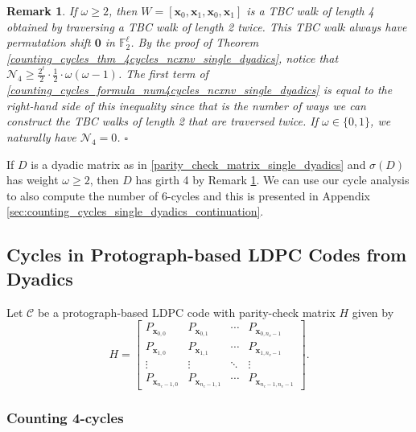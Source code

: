 \documentclass[11pt]{article}
\theoremstyle{plain}
\theoremstyle{plain}
\newtheorem{PreRemark}[lemma]{{\textbf{Remark}}}
\newenvironment{remark}%
    {\begin{PreRemark}\upshape}{\hfill$\square$\end{PreRemark}}
\theoremstyle{definition}
\numberwithin{theo}{section}
\newcommand{\bzero}{\mathbf{0}}
\newcommand{\bx}{{\mathbf x}}
\def\matrix#1{\begin{bmatrix}#1\end{bmatrix}} %
\newcounter{rom}
\begin{document}
\begin{remark}
\label{remark_N4_lower_bound}
If $\omega\geq2$, then $W=[\bx_0,\bx_1,\bx_0,\bx_1]$ is a TBC walk of length 4 obtained by traversing a TBC walk of length 2 twice. This TBC walk always have permutation shift $\bzero$ in $\mathbb{F}_2^\ell$. By the proof of Theorem \ref{counting_cycles_thm_4cycles_ncxnv_single_dyadics}, notice that $\mathcal{N}_4\geq\frac{2^\ell}{2}\cdot\frac{1}{2}\cdot\omega(\omega-1)$. The first term of \eqref{counting_cycles_formula_num4cycles_ncxnv_single_dyadics} is equal to the right-hand side of this inequality since that is the number of ways we can construct the TBC walks of length 2 that are traversed twice. If $\omega\in\{0,1\}$, we naturally have $\mathcal{N}_4=0$.  
\end{remark}

If $D$ is a dyadic matrix as in \eqref{parity_check_matrix_single_dyadics} and $\sigma(D)$ has weight $\omega\geq2$, then $D$ has girth 4 by Remark \ref{remark_N4_lower_bound}. We can use our cycle analysis to also compute the number of 6-cycles and this is presented in Appendix \ref{sec:counting_cycles_single_dyadics_continuation}.

\subsection{Cycles in Protograph-based LDPC Codes from Dyadics}
\label{sec:counting_cycles_dyadics}
 
Let $\mathcal{C}$ be a protograph-based LDPC code with parity-check matrix $H$ given by 
\begin{equation}
\label{parity_check_matrix_dyadics}
H=\matrix{ P_{\bx_{0,0}}&P_{\bx_{0,1}}&\cdots&P_{\bx_{0,n_v-1}} \\ P_{\bx_{1,0}}&P_{\bx_{1,1}}&\cdots&P_{\bx_{1,n_v-1}} \\ \vdots&\vdots&\ddots&\vdots \\ P_{\bx_{n_c-1,0}}&P_{\bx_{n_c-1,1}}&\cdots&P_{\bx_{n_c-1,n_v-1}}}.
\end{equation}

\subsubsection{Counting 4-cycles}
\label{counting_cycles_counting_4cycles_dyadics}
\end{document}
